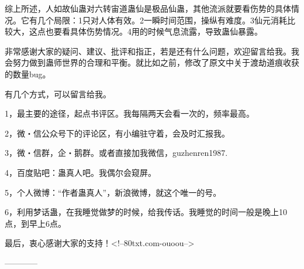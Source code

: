 \begin{this_body}
综上所述，人如故仙蛊对六转宙道蛊仙是极品仙蛊，其他流派就要看伤势的具体情况。它有几个局限：1只对人体有效。2一瞬时间范围，操纵有难度。3仙元消耗比较大，这点也要看具体伤势情况。4用的时候气息流露，导致蛊仙暴露。

非常感谢大家的疑问、建议、批评和指正，若是还有什么问题，欢迎留言给我。我会努力做到蛊师世界的合理和平衡。就比如之前，修改了原文中关于渡劫道痕收获的数量bug。

有几个方式，可以留言给我。

1，最主要的途径，起点书评区。我每隔两天会看一次的，频率最高。

2，微・信公众号下的评论区，有小编驻守着，会及时汇报我。

3，微・信群，企・鹅群。或者直接加我微信，guzhenren1987.

4，百度贴吧：蛊真人吧。我偶尔会窥屏。

5，个人微博：“作者蛊真人”，新浪微博，就这个唯一的号。

6，利用梦话蛊，在我睡觉做梦的时候，给我传话。我睡觉的时间一般是晚上10点，到早上6点。

最后，衷心感谢大家的支持！<!--80txt.com-ouoou-->

------------

\end{this_body}

